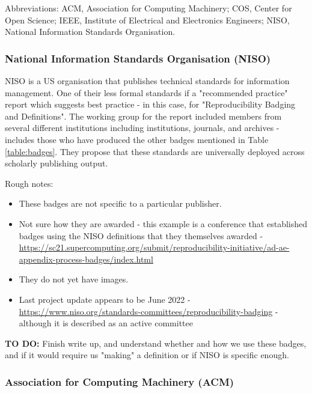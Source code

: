 \vspace*{-1.5\baselineskip}
\footnotesize Abbreviations: ACM, Association for Computing Machinery; COS, Center for Open Science; IEEE, Institute of Electrical and Electronics Engineers; NISO, National Information Standards Organisation.
\normalsize 
\\

\subsubsection{National Information Standards Organisation (NISO)}

NISO is a US organisation that publishes technical standards for information management. One of their less formal standards if a "recommended practice"  report which suggests best practice - in this case, for "Reproducibility Badging and Definitions". The working group for the report included members from several different institutions including institutions, journals, and archives - includes those who have produced the other badges mentioned in Table \ref{table:badges}. They propose that these standards are universally deployed across scholarly publishing output.\autocite{niso_reproducibility_badging_and_definitions_working_group_reproducibility_2021}

Rough notes:
\begin{itemize}
    \item These badges are not specific to a particular publisher.
    \item Not sure how they are awarded - this example is a conference that established badges using the NISO definitions that they themselves awarded - \url{https://sc21.supercomputing.org/submit/reproducibility-initiative/ad-ae-appendix-process-badges/index.html}
    \item They do not yet have images.
    \item Last project update appears to be June 2022 - \url{https://www.niso.org/standards-committees/reproducibility-badging} - although it is described as an active committee
\end{itemize}

\textbf{TO DO:} Finish write up, and understand whether and how we use these badges, and if it would require us "making" a definition or if NISO is specific enough.

\subsubsection{Association for Computing Machinery (ACM)}

